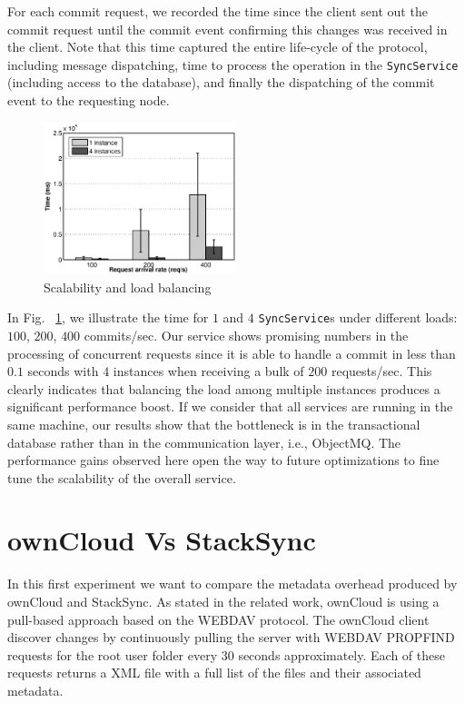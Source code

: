 For each commit request, we recorded the time since the client sent out the commit request until the commit event 
confirming this changes was received in the client. Note that this time captured the entire life-cycle of the protocol,
including message dispatching, time to process the operation in the \texttt{SyncService}
(including access to the database), and finally the dispatching of the commit event to the requesting node.

\begin{figure}[t]
\centering
\includegraphics[width=0.5\textwidth]{figures/performance_scalability}
\caption{Scalability and load balancing}\label{fig:scalability}
\end{figure}


In Fig. ~\ref{fig:scalability}, we illustrate the time for $1$ and $4$ \texttt{SyncService}s under different
loads: $100$, $200$, $400$ commits/sec. Our service shows promising numbers in the processing of concurrent
requests since it is able to handle a commit in less than $0.1$ seconds with $4$ instances when receiving
a bulk of $200$ requests/sec. This clearly indicates that balancing the load
among multiple instances produces a significant performance boost. If we consider that all services are
running in the same machine, our results show that the bottleneck is in the transactional database
rather than in the communication layer, i.e., ObjectMQ. The performance gains observed here open the
way to future optimizations to fine tune the scalability of the overall service. 





\section{ownCloud Vs StackSync}

In this first experiment we want to compare the metadata overhead produced by ownCloud and StackSync. As stated in the related work, ownCloud is using a pull-based approach based on the WEBDAV protocol. The ownCloud client discover changes by continuously pulling the server with WEBDAV PROPFIND requests for the root user folder every 30 seconds approximately. Each of these requests returns a XML file with a full list of the files and their associated metadata.


